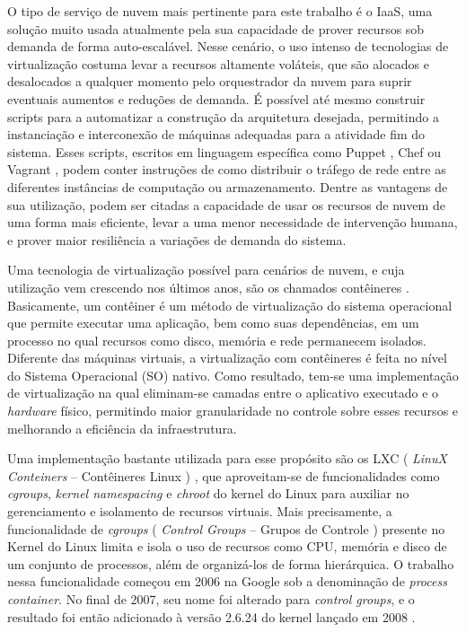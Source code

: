 O tipo de serviço de nuvem mais pertinente para este trabalho é o IaaS, uma solução muito usada atualmente pela sua capacidade de prover recursos sob demanda de forma auto-escalável.
%
Nesse cenário, o uso intenso de tecnologias de virtualização costuma levar a recursos altamente voláteis, que são alocados e desalocados a qualquer momento pelo orquestrador da nuvem para suprir eventuais aumentos e reduções de demanda.
%
É possível até mesmo construir scripts para a automatizar a construção da arquitetura desejada, permitindo a instanciação e interconexão de máquinas adequadas para a atividade fim do sistema.
%
Esses scripts, escritos em linguagem específica como Puppet \cite{Puppet2018}, Chef \cite{Chef2018} ou Vagrant \cite{Vagrant2018}, podem conter instruções de como distribuir o tráfego de rede entre as diferentes instâncias de computação ou armazenamento.
%
Dentre as vantagens de sua utilização, podem ser citadas a capacidade de usar os recursos de nuvem de uma forma mais eficiente, levar a uma menor necessidade de intervenção humana, e prover maior resiliência a variações de demanda do sistema.



Uma tecnologia de virtualização possível para cenários de nuvem, e cuja utilização vem crescendo nos últimos anos, são os chamados contêineres \cite{containers-tech:2014}. 
%
Basicamente, um contêiner é um método de virtualização do sistema operacional que permite executar uma aplicação, bem como suas dependências, em um processo no qual recursos como disco, memória e rede permanecem isolados.
%
Diferente das máquinas virtuais, a virtualização com contêineres é feita no nível do Sistema Operacional (SO) nativo.
%
Como resultado, tem-se uma implementação de virtualização na qual eliminam-se camadas entre o aplicativo executado e o \textit{hardware} físico, permitindo maior granularidade no controle sobre esses recursos e melhorando a eficiência da infraestrutura.


Uma implementação bastante utilizada para esse propósito são os LXC ( \textit{LinuX Conteiners} -- Contêineres Linux ) \cite{Linuxcontainers.org2015}, que aproveitam-se de funcionalidades como \textit{cgroups}, \textit{kernel namespacing} e \textit{chroot} do kernel do Linux para auxiliar no gerenciamento e isolamento de recursos virtuais.
%
Mais precisamente, a funcionalidade de \textit{cgroups} ( \textit{Control Groups} -- Grupos de Controle ) presente no Kernel do Linux limita e isola o uso de recursos como CPU, memória e disco de um conjunto de processos, além de organizá-los de forma hierárquica. 
%
O trabalho nessa funcionalidade começou em 2006 na Google sob a denominação de \textit{process container}. 
%
No final de 2007, seu nome foi alterado para \textit{control groups}, e o resultado foi então adicionado à versão 2.6.24 do kernel lançado em 2008 \cite{UnixManPagesControlGroups}.

